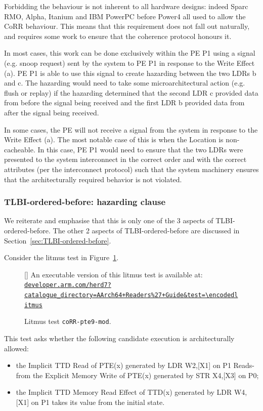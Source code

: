 \documentclass{book}
\newcommand{\litmusinput}[1]{%
}
\newcommand{\herdweburl}{https://developer.arm.com/herd7}
\newcommand{\herdweburldisplay}{developer.arm.com/herd7}
\newcommand{\litmusinputwithlinkat}[3][]{%
  \par
  \begin{figure}[#2]
    \litmusinput{#3}%
    \par\smallskip
    {\footnotesize
    \begingroup
    \StrSubstitute{#3}{+}{\%2B}[\encodedlitmus]%
    \edef\targeturl{\herdweburl?catalogue_directory=AArch64+Readers\%27+Guide\&test=\encodedlitmus}%
    \edef\displayurl{\herdweburldisplay?catalogue_directory=AArch64+Readers\%27+Guide&test=\encodedlitmus}%
    An executable version of this litmus test is available at:
    \href{\targeturl}{\nolinkurl{\displayurl}}%
    \endgroup
    \par}
    \caption{Litmus test \texttt{#3}.}
    \if\relax\detokenize{#1}\relax\else\label{#1}\fi
  \end{figure}
}
\newcommand{\litmusinputwithlink}[2][]{%
  \litmusinputwithlinkat[#1]{H}{#2}%
}
\begin{document}
Forbidding the behaviour is not inherent to all hardware designs: indeed Sparc
RMO, Alpha, Itanium and IBM PowerPC before Power4 all used to allow the CoRR
behaviour.  This means that this requirement does not fall out naturally, and
requires some work to ensure that the coherence protocol honours it. 
 
In most cases, this work can be done exclusively within the PE P1 using a
signal (e.g. snoop request) sent by the system to PE P1 in response to the
Write Effect (a). PE P1 is able to use this signal to create hazarding between
the two LDRs b and c. The hazarding would need to take some microarchitectural
action (e.g. flush or replay) if the hazarding determined that the second LDR c
provided data from before the signal being received and the first LDR b
provided data from after the signal being received.  
  
In some cases, the PE will not receive a signal from the system in response to
the Write Effect (a). The most notable case of this is when the Location is
non-cacheable. In this case, PE P1 would need to ensure that the two LDRs were
presented to the system interconnect in the correct order and with the correct
attributes (per the interconnect protocol) such that the system machinery
ensures that the architecturally required behavior is not violated. 

\subsubsection{TLBI-ordered-before: hazarding clause}

We reiterate and emphasise that this is only one of the 3 aspects of
TLBI-ordered-before. The other 2 aspects of TLBI-ordered-before are discussed
in Section~\ref{sec:TLBI-ordered-before}.

Consider the litmus test in Figure~\ref{fig:litmus-corr-pte9-mod}.
\litmusinputwithlink[fig:litmus-corr-pte9-mod]{coRR-pte9-mod}

This test asks whether the following candidate execution is architecturally allowed: 
\begin{itemize}
\item the Implicit TTD Read of PTE(x) generated by LDR W2,[X1] on P1 Reads-from the Explicit Memory Write of PTE(x) generated by STR X4,[X3] on P0; 
\item the Implicit TTD Memory Read Effect of TTD(x) generated by LDR W4,[X1] on P1 takes its value from the initial state. 
\end{itemize}
\end{document}
